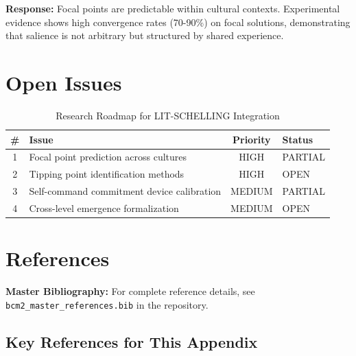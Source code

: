 \textbf{Response:} Focal points are predictable within cultural contexts.
Experimental evidence shows high convergence rates (70-90\%) on focal solutions,
demonstrating that salience is not arbitrary but structured by shared experience.


\section{Open Issues}
\label{sec:ts-open}

\begin{table}[htbp]
\centering
\caption{Research Roadmap for LIT-SCHELLING Integration}
\label{tab:ts-roadmap}
\renewcommand{\arraystretch}{1.3}
\begin{tabular}{@{}clcl@{}}
\toprule
\textbf{\#} & \textbf{Issue} & \textbf{Priority} & \textbf{Status} \\
\midrule
1 & Focal point prediction across cultures & HIGH & PARTIAL \\
2 & Tipping point identification methods & HIGH & OPEN \\
3 & Self-command commitment device calibration & MEDIUM & PARTIAL \\
4 & Cross-level emergence formalization & MEDIUM & OPEN \\
\bottomrule
\end{tabular}
\end{table}


\section{References}
\label{sec:ts-references}

\begin{tcolorbox}[colback=blue!5!white, colframe=blue!75!black]
\textbf{Master Bibliography:} For complete reference details, see
\texttt{bcm2\_master\_references.bib} in the repository.
\nocite{bcm_master}
\end{tcolorbox}

\subsection{Key References for This Appendix}

